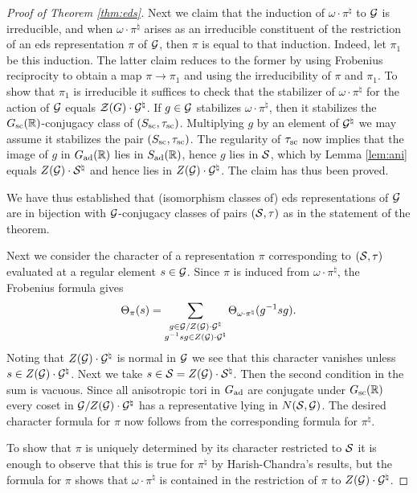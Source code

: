 \documentclass{article}
\theoremstyle{definition}
\numberwithin{equation}{section}
\renewcommand{\-}{\hyp{}}
\begin{document}
\begin{proof}[Proof of Theorem \ref{thm:eds}]
	Next we claim that the induction of $\omega\cdot\pi^\natural$ to $\mathcal{G}$ is irreducible, and when $\omega\cdot\pi^\natural$ arises as an irreducible constituent of the restriction of an eds representation $\pi$ of $\mathcal{G}$, then $\pi$ is equal to that induction. Indeed, let $\pi_1$ be this induction. The latter claim reduces to the former by using Frobenius reciprocity to obtain a map $\pi \to \pi_1$ and using the irreducibility of $\pi$ and $\pi_1$. To show that $\pi_1$ is irreducible it suffices to check that the stabilizer of $\omega\cdot\pi^\natural$ for the action of $\mathcal{G}$ equals $\mathcal{Z}(G) \cdot \mathcal{G}^\natural$. If $g \in \mathcal{G}$ stabilizes $\omega\cdot\pi^\natural$, then it stabilizes the $G_{\textrm{sc}}(\mathbb{R})$-conjugacy class of $(S_{\textrm{sc}},\tau_{\textrm{sc}})$. Multiplying $g$ by an element of $\mathcal{G}^\natural$ we may assume it stabilizes the pair $(S_{\textrm{sc}},\tau_{\textrm{sc}})$. The regularity of $\tau_{\textrm{sc}}$ now implies that the image of $g$ in $G_{\textrm{ad}}(\mathbb{R})$ lies in $S_{\textrm{ad}}(\mathbb{R})$, hence $g$ lies in $\mathcal{S}$, which by Lemma \ref{lem:ani} equals $Z(\mathcal{G})\cdot \mathcal{S}^\natural$ and hence lies in $Z(\mathcal{G})\cdot \mathcal{G}^\natural$. The claim has thus been proved.

	We have thus established that (isomorphism classes of) eds representations of $\mathcal{G}$ are in bijection with $\mathcal{G}$-conjugacy classes of pairs $(\mathcal{S},\tau)$ as in the statement of the theorem.

	Next we consider the character of a representation $\pi$ corresponding to $(\mathcal{S},\tau)$ evaluated at a regular element $s \in \mathcal{G}$. Since $\pi$ is induced from $\omega\cdot\pi^\natural$, the Frobenius formula gives
	\[ \Theta_\pi(s) = \sum_{\substack{g \in \mathcal{G}/Z(\mathcal{G})\cdot \mathcal{G}^\natural\\ g^{-1}sg \in Z(\mathcal{G})\cdot \mathcal{G}^\natural}} \Theta_{\omega\cdot\pi^\natural}(g^{-1}sg).\]
	Noting that $Z(\mathcal{G}) \cdot \mathcal{G}^\natural$ is normal in $\mathcal{G}$ we see that this character vanishes unless $s \in Z(\mathcal{G}) \cdot \mathcal{G}^\natural$. Next we take $s \in \mathcal{S} = Z(\mathcal{G}) \cdot \mathcal{S}^\natural$. Then the second condition in the sum is vacuous. Since all anisotropic tori in $G_{\textrm{ad}}$ are conjugate under $G_{\textrm{sc}}(\mathbb{R})$ every coset in $\mathcal{G}/Z(\mathcal{G})\cdot \mathcal{G}^\natural$ has a representative lying in $N(\mathcal{S},\mathcal{G})$. The desired character formula for $\pi$ now follows from the corresponding formula for $\pi^\natural$.

	To show that $\pi$ is uniquely determined by its character restricted to $\mathcal{S}$ it is enough to observe that this is true for $\pi^\natural$ by Harish-Chandra's results, but the formula for $\pi$ shows that $\omega \cdot \pi^\natural$ is contained in the restriction of $\pi$ to $Z(\mathcal{G}) \cdot \mathcal{G}^\natural$.	
\end{proof}
\end{document}
